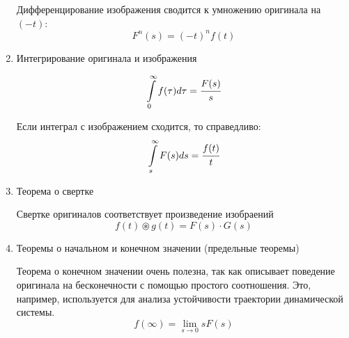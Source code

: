 \begin{enumerate}
        Дифференцирование изображения сводится к умножению оригинала на $(-t)$:
        \begin{equation}
            F^{n} (s) = (-t)^n f(t)    
        \end{equation}
    
    \item Интегрирование оригинала и изображения
    
        \begin{equation}
            \int\limits_0^{\infty} f(\tau) d\tau = \cfrac{F(s)}{s}
        \end{equation}
        
        Если интеграл с изображением сходится, то справедливо:
        \begin{equation}
            \int\limits_s^{\infty} F(s) ds = \cfrac{f(t)}{t}
        \end{equation}
        
    \item Теорема о свертке
    
    Свертке оригиналов соответствует произведение изобраений
    \begin{equation}
        f(t) \circledast g(t) = F(s) \cdot G(s)
    \end{equation}
    
    \item Теоремы о начальном и конечном значении (предельные теоремы)
    
    Теорема о конечном значении очень полезна, так как описывает поведение оригинала на бесконечности с помощью простого соотношения. Это, например, используется для анализа устойчивости траектории динамической системы.
    \begin{equation}
        f(\infty) = \lim_{s \to 0} s F(s)
    \end{equation}
\end{enumerate}



